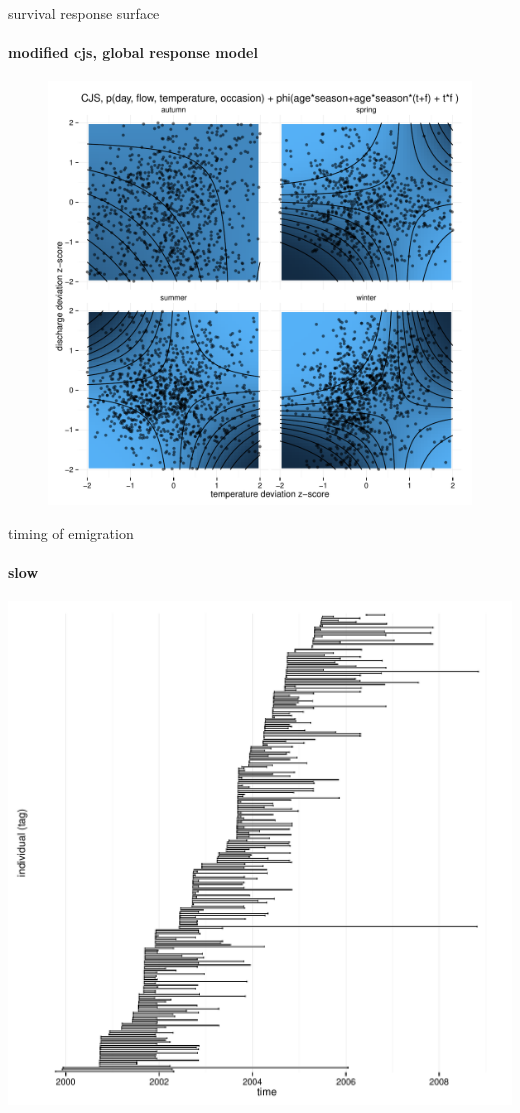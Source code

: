 \documentclass[show notes]{beamer}
\begin{document}
\begin{frame}{survival response surface}
  \framesubtitle{modified cjs, global response model}

	\begin{figure}
	\includegraphics[clip, trim=0 0 0 35, height=.8\textheight]{pl-1-1-cjs-seasonal-logit-recapture_full_RE-phi_full_x-phi-heat-map.pdf}
  	\end{figure}

\end{frame}


\begin{frame}{timing of emigration}
  \framesubtitle{slow}	
  \includegraphics[clip, trim=0 0 0 0, height=.8\textheight]{emigrant-tracks.pdf}
    
\end{frame}
\end{document}
